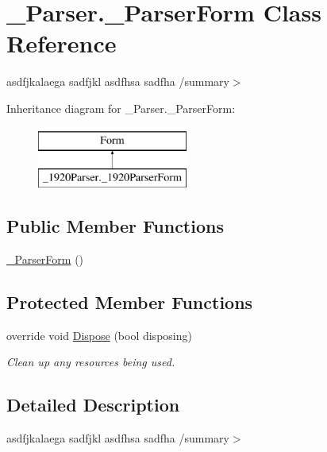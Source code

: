 \hypertarget{class__1920_parser_1_1__1920_parser_form}{}\section{\+\_\+Parser.\+\_\+Parser\+Form Class Reference}
\label{class__1920_parser_1_1__1920_parser_form}


asdfjkalaega sadfjkl asdfhsa sadfha /summary$>$  


Inheritance diagram for \+\_\+Parser.\+\_\+Parser\+Form\+:\begin{figure}[H]
\begin{center}
\leavevmode
\includegraphics[height=2.000000cm]{class__1920_parser_1_1__1920_parser_form}
\end{center}
\end{figure}
\subsection*{Public Member Functions}
\begin{DoxyCompactItemize}
\item 
\hyperlink{class__1920_parser_1_1__1920_parser_form_ad4ad99c74a78589f16c5a75d7f0eda22}{\+\_\+Parser\+Form} ()
\end{DoxyCompactItemize}
\subsection*{Protected Member Functions}
\begin{DoxyCompactItemize}
\item 
override void \hyperlink{class__1920_parser_1_1__1920_parser_form_a834ea0eefb07ff1fdd7afea7a20834fa}{Dispose} (bool disposing)
\begin{DoxyCompactList}\small\item\em Clean up any resources being used. \end{DoxyCompactList}\end{DoxyCompactItemize}


\subsection{Detailed Description}
asdfjkalaega sadfjkl asdfhsa sadfha /summary$>$ 

